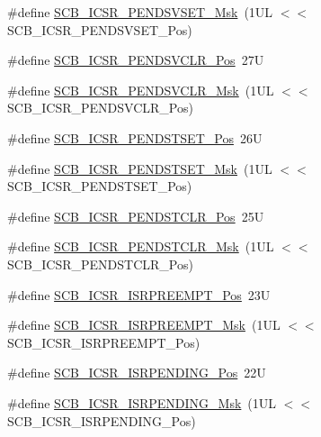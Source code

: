 \begin{DoxyCompactItemize}
\#define \mbox{\hyperlink{group___c_m_s_i_s___s_c_b_ga1e40d93efb402763c8c00ddcc56724ff}{S\+C\+B\+\_\+\+I\+C\+S\+R\+\_\+\+P\+E\+N\+D\+S\+V\+S\+E\+T\+\_\+\+Msk}}~(1\+U\+L $<$$<$ S\+C\+B\+\_\+\+I\+C\+S\+R\+\_\+\+P\+E\+N\+D\+S\+V\+S\+E\+T\+\_\+\+Pos)
\item 
\#define \mbox{\hyperlink{group___c_m_s_i_s___s_c_b_gae218d9022288f89faf57187c4d542ecd}{S\+C\+B\+\_\+\+I\+C\+S\+R\+\_\+\+P\+E\+N\+D\+S\+V\+C\+L\+R\+\_\+\+Pos}}~27U
\item 
\#define \mbox{\hyperlink{group___c_m_s_i_s___s_c_b_ga4a901ace381d3c1c74ac82b22fae2e1e}{S\+C\+B\+\_\+\+I\+C\+S\+R\+\_\+\+P\+E\+N\+D\+S\+V\+C\+L\+R\+\_\+\+Msk}}~(1\+U\+L $<$$<$ S\+C\+B\+\_\+\+I\+C\+S\+R\+\_\+\+P\+E\+N\+D\+S\+V\+C\+L\+R\+\_\+\+Pos)
\item 
\#define \mbox{\hyperlink{group___c_m_s_i_s___s_c_b_ga9dbb3358c6167c9c3f85661b90fb2794}{S\+C\+B\+\_\+\+I\+C\+S\+R\+\_\+\+P\+E\+N\+D\+S\+T\+S\+E\+T\+\_\+\+Pos}}~26U
\item 
\#define \mbox{\hyperlink{group___c_m_s_i_s___s_c_b_ga7325b61ea0ec323ef2d5c893b112e546}{S\+C\+B\+\_\+\+I\+C\+S\+R\+\_\+\+P\+E\+N\+D\+S\+T\+S\+E\+T\+\_\+\+Msk}}~(1\+U\+L $<$$<$ S\+C\+B\+\_\+\+I\+C\+S\+R\+\_\+\+P\+E\+N\+D\+S\+T\+S\+E\+T\+\_\+\+Pos)
\item 
\#define \mbox{\hyperlink{group___c_m_s_i_s___s_c_b_gadbe25e4b333ece1341beb1a740168fdc}{S\+C\+B\+\_\+\+I\+C\+S\+R\+\_\+\+P\+E\+N\+D\+S\+T\+C\+L\+R\+\_\+\+Pos}}~25U
\item 
\#define \mbox{\hyperlink{group___c_m_s_i_s___s_c_b_gab241827d2a793269d8cd99b9b28c2157}{S\+C\+B\+\_\+\+I\+C\+S\+R\+\_\+\+P\+E\+N\+D\+S\+T\+C\+L\+R\+\_\+\+Msk}}~(1\+U\+L $<$$<$ S\+C\+B\+\_\+\+I\+C\+S\+R\+\_\+\+P\+E\+N\+D\+S\+T\+C\+L\+R\+\_\+\+Pos)
\item 
\#define \mbox{\hyperlink{group___c_m_s_i_s___s_c_b_ga11cb5b1f9ce167b81f31787a77e575df}{S\+C\+B\+\_\+\+I\+C\+S\+R\+\_\+\+I\+S\+R\+P\+R\+E\+E\+M\+P\+T\+\_\+\+Pos}}~23U
\item 
\#define \mbox{\hyperlink{group___c_m_s_i_s___s_c_b_gaa966600396290808d596fe96e92ca2b5}{S\+C\+B\+\_\+\+I\+C\+S\+R\+\_\+\+I\+S\+R\+P\+R\+E\+E\+M\+P\+T\+\_\+\+Msk}}~(1\+U\+L $<$$<$ S\+C\+B\+\_\+\+I\+C\+S\+R\+\_\+\+I\+S\+R\+P\+R\+E\+E\+M\+P\+T\+\_\+\+Pos)
\item 
\#define \mbox{\hyperlink{group___c_m_s_i_s___s_c_b_ga10749d92b9b744094b845c2eb46d4319}{S\+C\+B\+\_\+\+I\+C\+S\+R\+\_\+\+I\+S\+R\+P\+E\+N\+D\+I\+N\+G\+\_\+\+Pos}}~22U
\item 
\#define \mbox{\hyperlink{group___c_m_s_i_s___s_c_b_ga056d74fd538e5d36d3be1f28d399c877}{S\+C\+B\+\_\+\+I\+C\+S\+R\+\_\+\+I\+S\+R\+P\+E\+N\+D\+I\+N\+G\+\_\+\+Msk}}~(1\+U\+L $<$$<$ S\+C\+B\+\_\+\+I\+C\+S\+R\+\_\+\+I\+S\+R\+P\+E\+N\+D\+I\+N\+G\+\_\+\+Pos)

\end{DoxyCompactItemize}
